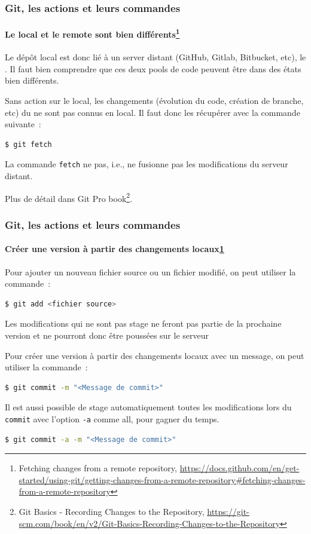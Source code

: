 \documentclass{beamer}
\begin{document}
    \begin{frame}[fragile]
        \frametitle{Git, les actions et leurs commandes}
        \framesubtitle{Le local et le remote sont bien différents\footnote{\label{progitfetch}Fetching changes from a remote repository, \url{https://docs.github.com/en/get-started/using-git/getting-changes-from-a-remote-repository\#fetching-changes-from-a-remote-repository}}}
        \transdissolve
        Le dépôt local est donc lié à un server distant (GitHub, Gitlab, Bitbucket, etc), le .
        Il faut bien comprendre que ces deux pools de code peuvent être dans des états bien différents.

        Sans action sur le local, les changements (évolution du code, création de branche, etc) du  ne sont pas connus en local.
        Il faut donc les récupérer avec la commande suivante~:
        \begin{lstlisting}[language=sh]
$ git fetch
        \end{lstlisting}
        La commande \lstinline{fetch} ne  pas, i.e., ne fusionne pas les modifications du serveur distant.

        Plus de détail dans Git Pro book\footnote{Git Basics - Recording Changes to the Repository, \url{https://git-scm.com/book/en/v2/Git-Basics-Recording-Changes-to-the-Repository}}.

    \end{frame}


    \begin{frame}[fragile]
        \frametitle{Git, les actions et leurs commandes}
        \framesubtitle{Créer une version à partir des changements locaux\cref{progitfetch}}
        \transdissolve

        Pour ajouter un nouveau fichier source ou  un fichier modifié, on peut utiliser la commande~:
        \begin{lstlisting}[language=sh]
$ git add <fichier source>
        \end{lstlisting}

        Les modifications qui ne sont pas stage ne feront pas partie de la prochaine version et ne pourront donc être poussées sur le serveur


        Pour créer une version à partir des changements locaux avec un message, on peut utiliser la commande~:

        \begin{lstlisting}[language=sh]
$ git commit -m "<Message de commit>"
        \end{lstlisting}

        Il est aussi possible de stage automatiquement toutes les modifications lors du \lstinline{commit} avec l'option \lstinline{-a} comme all, pour gagner du temps.

        \begin{lstlisting}[language=sh]
$ git commit -a -m "<Message de commit>"
        \end{lstlisting}
    \end{frame}
\end{document}
